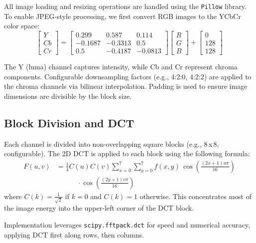 All image loading and resizing operations are handled using the \texttt{Pillow} library. To enable JPEG-style processing, we first convert RGB images to the YCbCr color space:
\begin{equation}
\begin{bmatrix} Y \\ Cb \\ Cr \end{bmatrix} = 
\begin{bmatrix} 0.299 & 0.587 & 0.114 \\ -0.1687 & -0.3313 & 0.5 \\ 0.5 & -0.4187 & -0.0813 \end{bmatrix} \begin{bmatrix} R \\ G \\ B \end{bmatrix} + \begin{bmatrix} 0 \\ 128 \\ 128 \end{bmatrix}
\end{equation}

The Y (luma) channel captures intensity, while Cb and Cr represent chroma components. Configurable downsampling factors (e.g., 4:2:0, 4:2:2) are applied to the chroma channels via bilinear interpolation. Padding is used to ensure image dimensions are divisible by the block size.

\subsection{Block Division and DCT}

Each channel is divided into non-overlapping square blocks (e.g., 8\,x\,8, configurable). The 2D DCT is applied to each block using the following formula:
\begin{align}
  F(u, v) &= \frac{1}{4} C(u)C(v) \sum_{x=0}^{7} \sum_{y=0}^{7} f(x,y) \,
  \cos\left( \frac{(2x+1)u\pi}{16} \right) \nonumber \\
  &\hspace{3em} \cdot \cos\left( \frac{(2y+1)v\pi}{16} \right)
\end{align}
where $C(k) = \frac{1}{\sqrt{2}}$ if $k = 0$ and $C(k) = 1$ otherwise. This concentrates most of the image energy into the upper-left corner of the DCT block.

Implementation leverages \texttt{scipy.fftpack.dct} for speed and numerical accuracy, applying DCT first along rows, then columns.

